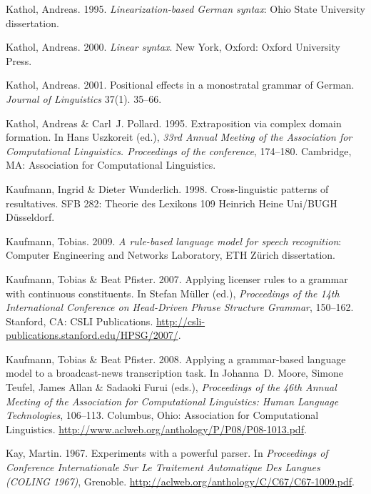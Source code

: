 \begin{thebibliography}{1420}
Kathol, Andreas. 1995.
\newblock \emph{Linearization-based {German} syntax}: Ohio State University
  dissertation.

Kathol, Andreas. 2000.
\newblock \emph{Linear syntax}.
\newblock New York, Oxford: Oxford University Press.

Kathol, Andreas. 2001.
\newblock Positional effects in a monostratal grammar of {German}.
\newblock \emph{Journal of Linguistics} 37(1). 35--66.

Kathol, Andreas \& Carl~J. Pollard. 1995.
\newblock Extraposition via complex domain formation.
\newblock In Hans Uszkoreit (ed.), \emph{33rd {Annual Meeting of the
  Association for Computational Linguistics. Proceedings} of the conference},
  174--180. Cambridge, MA: Association for Computational Linguistics.

Kaufmann, Ingrid \& Dieter Wunderlich. 1998.
\newblock Cross-linguistic patterns of resultatives.
\newblock SFB 282: Theorie des Lexikons 109 Heinrich Heine Uni/BUGH
  D{\"u}sseldorf.

Kaufmann, Tobias. 2009.
\newblock \emph{A rule-based language model for speech recognition}: Computer
  Engineering and Networks Laboratory, ETH Z{\"u}rich dissertation.

Kaufmann, Tobias \& Beat Pfister. 2007.
\newblock Applying licenser rules to a grammar with continuous constituents.
\newblock In Stefan M{\"u}ller (ed.), \emph{Proceedings of the {14th
  International Conference on Head-Driven Phrase Structure Grammar}}, 150--162.
  Stanford, CA: CSLI Publications.
\newblock \urlprefix\url{http://csli-publications.stanford.edu/HPSG/2007/}.

Kaufmann, Tobias \& Beat Pfister. 2008.
\newblock Applying a grammar-based language model to a broadcast-news
  transcription task.
\newblock In Johanna~D. Moore, Simone Teufel, James Allan \& Sadaoki Furui
  (eds.), \emph{Proceedings of the {46th Annual Meeting of the Association for
  Computational Linguistics: Human Language Technologies}}, 106--113. Columbus,
  Ohio: Association for Computational Linguistics.
\newblock \urlprefix\url{http://www.aclweb.org/anthology/P/P08/P08-1013.pdf}.

Kay, Martin. 1967.
\newblock Experiments with a powerful parser.
\newblock In \emph{Proceedings of {Conference Internationale Sur Le Traitement
  Automatique Des Langues ({COLING} 1967)}}, Grenoble.
\newblock \urlprefix\url{http://aclweb.org/anthology/C/C67/C67-1009.pdf}.


\end{thebibliography}
